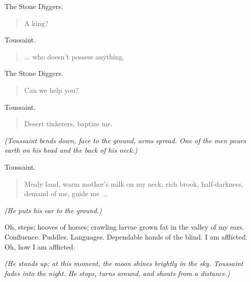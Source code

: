 \documentclass[letterpaper,article,12pt,oneside,notitlepage]{memoir}
\begin{document}
\begin{center}The Stone Diggers.\end{center}

\begin{verse}
A king? \\
\end{verse}

\begin{center}Toussaint.\end{center}

\begin{verse}
... who doesn't possess anything. \\
\end{verse}

\begin{center}The Stone Diggers.\end{center}

\begin{verse}
Can we help you? \\
\end{verse}

\begin{center}Toussaint.\end{center}

\begin{verse}
Desert tinkerers, baptize me. \\
\end{verse}

\textit{(Toussaint bends down, face to the ground, arms spread. One of the men pours earth on his head and the back of his neck.)}

\clearpage

\begin{center}Toussaint.\end{center}

\begin{verse}
Mealy land, warm mother's milk on my neck, rich brook, half-darkness, demand of me, guide me ... \\
\end{verse}

\textit{(He puts his ear to the ground.)}

Oh, steps; hooves of horses; crawling larvae grown fat in the valley of my ears. Confluence. Puddles. Languages. Dependable hands of the blind. I am afflicted. Oh, how I am afflicted.

\textit{(He stands up; at this moment, the moon shines brightly in the sky. Toussaint fades into the night. He stops, turns around, and shouts from a distance.)}
\end{document}
